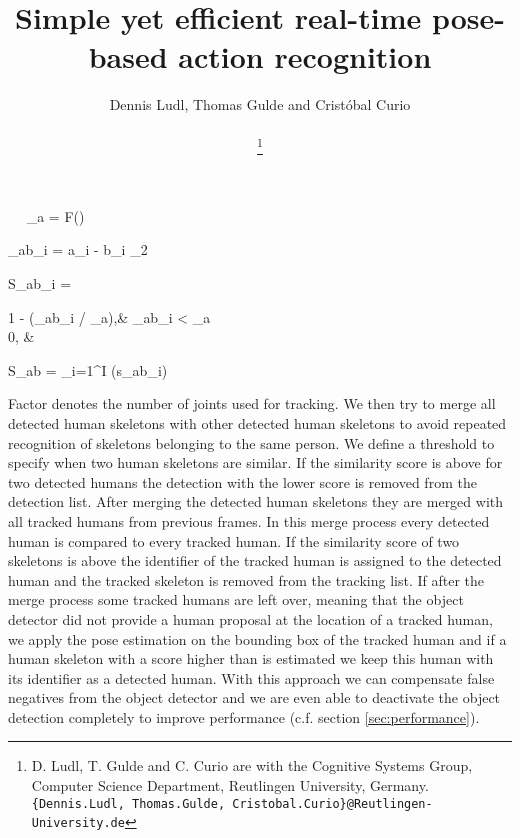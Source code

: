 \documentclass[a4paper, 10pt, conference]{ieeeconf}
\title{\LARGE \bf
Simple yet efficient real-time pose-based action recognition
}
\author{Dennis Ludl, Thomas Gulde and Crist\'obal Curio\\
	\scriptsize \\
\thanks{D. Ludl, T. Gulde and C. Curio are with the Cognitive Systems Group, Computer Science Department, Reutlingen University, Germany.
{\tt\small \{Dennis.Ludl, Thomas.Gulde, Cristobal.Curio\}@Reutlingen-University.de}
}}
\begin{document}
\begin{minipage}{\textwidth}\ \
  \label{eq:delta_a}
  \Delta_{a} = F()

  \label{eq:joint_distance}
    \delta_{ab_{i}} = \rVert a_i - b_i \rVert_2

  \label{eq:joint_similarity}
    S_{ab_{i}} = \begin{cases}
        1 - (\delta_{ab_{i}} / \Delta_{a}),&  \delta_{ab_{i}} < \Delta_{a}\\
        0,              & \text{otherwise}
    \end{cases}

  \label{eq:skeleton_similarity}
    S_{ab} = \sum\limits_{i=1}^I (s_{ab_{i}})


Factor  denotes the number of joints used for tracking. We then try to merge all detected human skeletons with other detected human skeletons to avoid repeated recognition of skeletons belonging to the same person. We define a threshold  to specify when two human skeletons are similar. If the similarity score is above  for two detected humans the detection with the lower score is removed from the detection list. After merging the detected human skeletons they are merged with all tracked humans from previous frames. In this merge process every detected human is compared to every tracked human. If the similarity score of two skeletons is above  the identifier of the tracked human is assigned to the detected human and the tracked skeleton is removed from the tracking list. If after the merge process some tracked humans are left over, meaning that the object detector did not provide a human proposal at the location of a tracked human, we apply the pose estimation on the bounding box of the tracked human and if a human skeleton with a score higher than  is estimated we keep this human with its identifier as a detected human. With this approach we can compensate false negatives from the object detector and we are even able to deactivate the object detection completely to improve performance (c.f. section \ref{sec:performance}).


\end{minipage}
\end{document}
